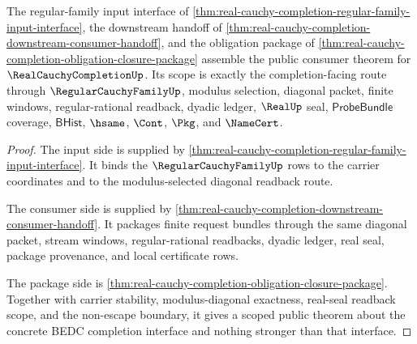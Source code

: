 \begin{theorem}
\label{thm:real-cauchy-completion-scoped-consumer-route}
The regular-family input interface of \autoref{thm:real-cauchy-completion-regular-family-input-interface}, the downstream handoff of \autoref{thm:real-cauchy-completion-downstream-consumer-handoff}, and the obligation package of \autoref{thm:real-cauchy-completion-obligation-closure-package} assemble the public consumer theorem for $\RealCauchyCompletionUp$. Its scope is exactly the completion-facing route through $\RegularCauchyFamilyUp$, modulus selection, diagonal packet, finite windows, regular-rational readback, dyadic ledger, $\RealUp$ seal, $\mathsf{ProbeBundle}$ coverage, $\mathsf{BHist}$, $\hsame$, $\Cont$, $\Pkg$, and $\NameCert$.
\end{theorem}
\begin{proof}
The input side is supplied by \autoref{thm:real-cauchy-completion-regular-family-input-interface}. It binds the $\RegularCauchyFamilyUp$ rows to the carrier coordinates and to the modulus-selected diagonal readback route.

The consumer side is supplied by \autoref{thm:real-cauchy-completion-downstream-consumer-handoff}. It packages finite request bundles through the same diagonal packet, stream windows, regular-rational readbacks, dyadic ledger, real seal, package provenance, and local certificate rows.

The package side is \autoref{thm:real-cauchy-completion-obligation-closure-package}. Together with carrier stability, modulus-diagonal exactness, real-seal readback scope, and the non-escape boundary, it gives a scoped public theorem about the concrete BEDC completion interface and nothing stronger than that interface.
\end{proof}

